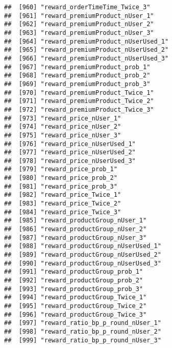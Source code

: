 \documentclass[10pt]{report}
\begin{document}
\begin{verbatim}
##  [960] "reward_orderTimeTime_Twice_3"                         
##  [961] "reward_premiumProduct_nUser_1"                        
##  [962] "reward_premiumProduct_nUser_2"                        
##  [963] "reward_premiumProduct_nUser_3"                        
##  [964] "reward_premiumProduct_nUserUsed_1"                    
##  [965] "reward_premiumProduct_nUserUsed_2"                    
##  [966] "reward_premiumProduct_nUserUsed_3"                    
##  [967] "reward_premiumProduct_prob_1"                         
##  [968] "reward_premiumProduct_prob_2"                         
##  [969] "reward_premiumProduct_prob_3"                         
##  [970] "reward_premiumProduct_Twice_1"                        
##  [971] "reward_premiumProduct_Twice_2"                        
##  [972] "reward_premiumProduct_Twice_3"                        
##  [973] "reward_price_nUser_1"                                 
##  [974] "reward_price_nUser_2"                                 
##  [975] "reward_price_nUser_3"                                 
##  [976] "reward_price_nUserUsed_1"                             
##  [977] "reward_price_nUserUsed_2"                             
##  [978] "reward_price_nUserUsed_3"                             
##  [979] "reward_price_prob_1"                                  
##  [980] "reward_price_prob_2"                                  
##  [981] "reward_price_prob_3"                                  
##  [982] "reward_price_Twice_1"                                 
##  [983] "reward_price_Twice_2"                                 
##  [984] "reward_price_Twice_3"                                 
##  [985] "reward_productGroup_nUser_1"                          
##  [986] "reward_productGroup_nUser_2"                          
##  [987] "reward_productGroup_nUser_3"                          
##  [988] "reward_productGroup_nUserUsed_1"                      
##  [989] "reward_productGroup_nUserUsed_2"                      
##  [990] "reward_productGroup_nUserUsed_3"                      
##  [991] "reward_productGroup_prob_1"                           
##  [992] "reward_productGroup_prob_2"                           
##  [993] "reward_productGroup_prob_3"                           
##  [994] "reward_productGroup_Twice_1"                          
##  [995] "reward_productGroup_Twice_2"                          
##  [996] "reward_productGroup_Twice_3"                          
##  [997] "reward_ratio_bp_p_round_nUser_1"                      
##  [998] "reward_ratio_bp_p_round_nUser_2"                      
##  [999] "reward_ratio_bp_p_round_nUser_3"                      

\end{verbatim}
\end{document}

